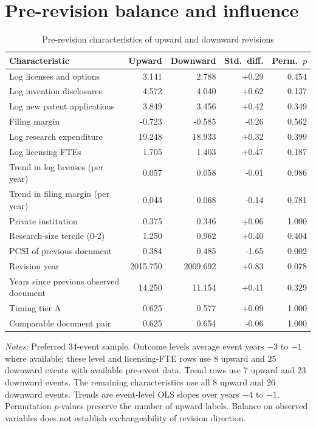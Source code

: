 \section{Pre-revision balance and influence}\label{app:direction}

\begin{table}[htbp]\centering
\caption{Pre-revision characteristics of upward and downward revisions}\label{tab:balance}
\begin{threeparttable}\footnotesize
\begin{tabular}{lrrrr}\toprule
Characteristic & Upward & Downward & Std.\ diff. & Perm.\ $p$ \\\midrule
Log licenses and options & 3.141 & 2.788 & +0.29 & 0.454 \\
Log invention disclosures & 4.572 & 4.040 & +0.62 & 0.137 \\
Log new patent applications & 3.849 & 3.456 & +0.42 & 0.349 \\
Filing margin & -0.723 & -0.585 & -0.26 & 0.562 \\
Log research expenditure & 19.248 & 18.933 & +0.32 & 0.399 \\
Log licensing FTEs & 1.705 & 1.403 & +0.47 & 0.187 \\
Trend in log licenses (per year) & 0.057 & 0.058 & -0.01 & 0.986 \\
Trend in filing margin (per year) & 0.043 & 0.068 & -0.14 & 0.781 \\
Private institution & 0.375 & 0.346 & +0.06 & 1.000 \\
Research-size tercile (0-2) & 1.250 & 0.962 & +0.40 & 0.404 \\
PCSI of previous document & 0.384 & 0.485 & -1.65 & 0.002 \\
Revision year & 2015.750 & 2009.692 & +0.83 & 0.078 \\
Years since previous observed document & 14.250 & 11.154 & +0.41 & 0.329 \\
Timing tier A & 0.625 & 0.577 & +0.09 & 1.000 \\
Comparable document pair & 0.625 & 0.654 & -0.06 & 1.000 \\
\bottomrule
\end{tabular}
\begin{tablenotes}[flushleft]\footnotesize
\item \textit{Notes:} Preferred 34-event sample. Outcome levels average event years $-3$ to $-1$ where available; these level and licensing-FTE rows use 8 upward and 25 downward events with available pre-event data. Trend rows use 7 upward and 23 downward events. The remaining characteristics use all 8 upward and 26 downward events. Trends are event-level OLS slopes over years $-4$ to $-1$. Permutation $p$-values preserve the number of upward labels. Balance on observed variables does not establish exchangeability of revision direction.
\end{tablenotes}
\end{threeparttable}
\end{table}


